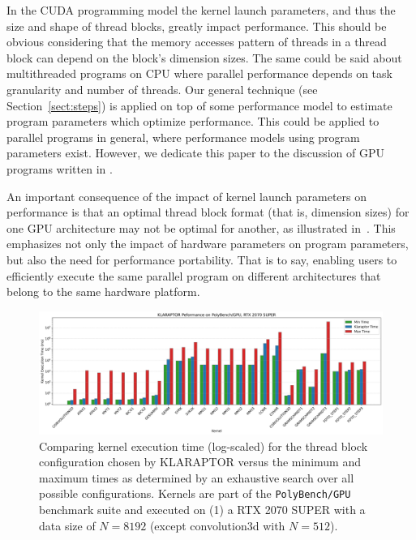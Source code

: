 In the CUDA programming model the kernel launch parameters,
and thus the size and shape of thread blocks, greatly impact performance.
This should be obvious considering that the memory accesses pattern of threads
in a thread block can depend on the block's dimension sizes. 
The same could be said about multithreaded programs on CPU where
parallel performance depends on task granularity and number of threads.
Our general technique (see Section~\ref{sect:steps}) 
is applied on top of some performance model to estimate 
program parameters which optimize performance. 
This could be applied to parallel programs in general, 
where performance models using program parameters exist.
However, we dedicate this paper to the discussion of 
GPU programs written in {\cuda}.


An important consequence of the impact of kernel launch parameters on performance
is that an optimal thread block format (that is, dimension sizes)
for one GPU architecture may 
not be optimal for another, as illustrated
in~\cite{DBLP:journals/tjs/TorresGL13}.
This emphasizes not only the impact of hardware parameters on program parameters, 
but also the need for performance portability.
That is to say, enabling users to efficiently execute the same parallel program
on different architectures that belong to the same hardware platform.

\begin{figure}[hbt]
\includegraphics[width=1.00\textwidth, trim={0em, 0.9em, 0em, 0em}, clip]{Figures/MinMaxTimes-RTX-8192.png}
\caption{Comparing kernel execution time (log-scaled) for the thread block configuration chosen by KLARAPTOR
versus the minimum and maximum times as determined by an exhaustive search over all possible configurations. 
Kernels are part of the \texttt{PolyBench/GPU} benchmark suite and executed on (1) a RTX 2070 SUPER with a data 
size of $N=8192$ (except convolution3d with $N=512$).}
\label{fig:kernelperfintro}
\end{figure}

